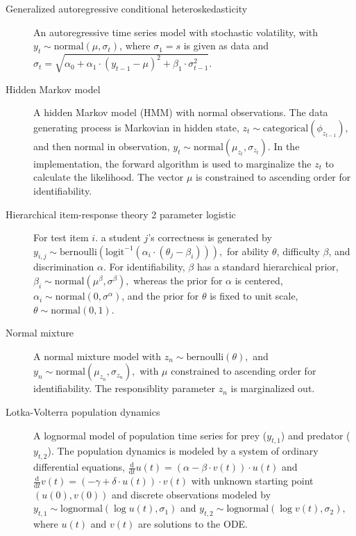 \documentclass[letterpaper,11pt]{article}
\theoremstyle{plain}%
\theoremstyle{remark}
\begin{document}
\begin{description}
\item[Generalized autoregressive conditional heteroskedasticity] 
An autoregressive time series model with stochastic volatility, with $y_t \sim \textrm{normal}(\mu, \sigma_t)$, where $\sigma_1 = s$ is given as data and $\sigma_t = \sqrt{\alpha_0 + \alpha_1 \cdot (y_{t-1} - \mu)^2 + \beta_1 \cdot \sigma_{t-1}^2}.$

\item[Hidden Markov model]
A hidden Markov model (HMM) with normal observations.  The data generating process is Markovian in hidden state, $z_t \sim \textrm{categorical}(\phi_{z_{t-1}}),$ and then normal in observation, $y_t \sim \textrm{normal}(\mu_{z_t}, \sigma_{z_t}).$  In the implementation, the forward algorithm is used to marginalize the $z_t$ to calculate the likelihood.  The vector $\mu$ is constrained to ascending order for identifiability.

\item[Hierarchical item-response theory 2 parameter logistic]
For test item $i$. a student $j$'s correctness is generated by $y_{i, j} \sim \textrm{bernoulli}(\textrm{logit}^{-1}(\alpha_i \cdot (\theta_j - \beta_i))),$ for ability $\theta$, difficulty $\beta$, and discrimination $\alpha.$  For identifiability, $\beta$ has a standard hierarchical prior, $\beta_i \sim \textrm{normal}(\mu^{\beta}, \sigma^{\beta}),$ whereas the prior for $\alpha$ is centered, $\alpha_i \sim \textrm{normal}(0, \sigma^{\alpha})$, and the prior for $\theta$ is fixed to unit scale, $\theta \sim \textrm{normal}(0, 1)$.  

\item[Normal mixture]
A normal mixture model with $z_n \sim \textrm{bernoulli}(\theta),$ and $y_n \sim \textrm{normal}(\mu_{z_n}, \sigma_{z_n}),$ with $\mu$ constrained to ascending order for identifiability.  The responsiblity parameter $z_n$ is marginalized out.


\item[Lotka-Volterra population dynamics]

A lognormal model of population time series for prey ($y_{t,1}$) and predator ($y_{t,2}$).  The population dynamics is modeled by a system of ordinary differential equations, $\frac{\textrm{d}}{\textrm{d}t} u(t) = (\alpha - \beta \cdot v(t)) \cdot u(t)$ and $\frac{\textrm{d}}{\textrm{d}{t}} v(t) = (-\gamma + \delta \cdot u(t)) \cdot v(t)$ with unknown starting point $(u(0), v(0))$ and discrete observations modeled by $y_{t, 1} \sim \textrm{lognormal}(\log u(t), \sigma_1)$ and $y_{t, 2} \sim \textrm{lognormal}(\log v(t), \sigma_2),$  where $u(t)$ and $v(t)$ are solutions to the ODE.


\end{description}
\end{document}
